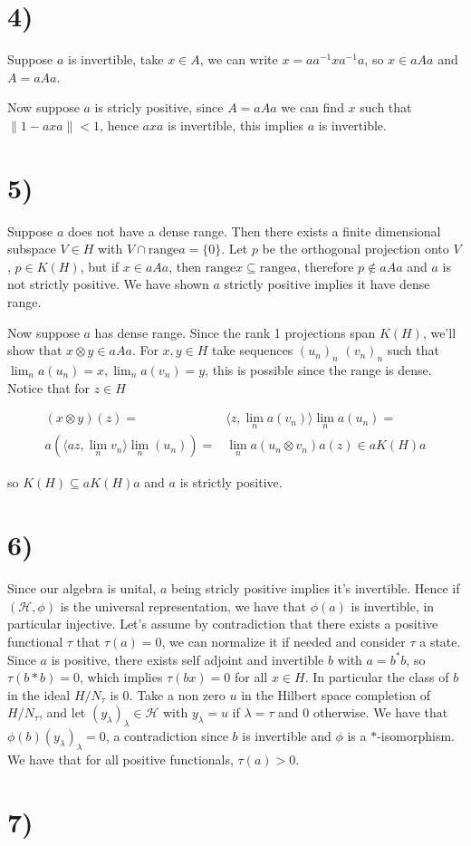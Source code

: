\documentclass{article}
\begin{document}
\section*{4)}

Suppose $a$ is invertible, take $x\in A$, we can write $x=a a^{-1}x a^{-1}a$,
so $x\in aAa$ and $A=aAa$.

Now suppose $a$ is stricly positive, since $A=aAa$ we can find $x$ such that
$\|1-axa\|<1$, hence $axa$ is invertible, this implies $a$ is invertible. 

\section*{5)}

Suppose $a$ does not have a dense range. Then there exists a finite dimensional
subspace $V\in H$ with $V\cap \text{range} a=\{0\}$. Let $p$ be the orthogonal
projection onto $V$, $p\in K(H)$, but if $x\in aAa$, then $\text{range} x\subseteq 
\text{range} a $, therefore $p\notin aAa$ and $a$ is not strictly positive.
We have shown $a$ strictly positive implies it have dense range.

Now suppose $a$ has dense range. Since the rank 1 projections span $K(H)$, 
we'll show that $x\otimes y \in aAa$. For $x,y\in H$ take sequences $(u_n)_n$
$(v_n)_n$ such that $\lim_n a(u_n)=x, \lim_n a(v_n)=y$, this is possible since
the range is dense.
Notice that  for $z\in H$

\begin{align*}
    (x\otimes y)(z)=& \langle z,\lim_n a(v_n) \rangle \lim_n a(u_n)=\\
    a (\langle az, \lim_n v_n \rangle \lim_n (u_n))=&\lim_n a(u_n\otimes v_n)a(z)\in aK(H)a
\end{align*}

so $K(H)\subseteq aK(H)a$ and $a$ is strictly positive.


\section*{6)}

Since our algebra is unital, $a$ being stricly positive implies it's invertible.
Hence if $(\mathcal{H},\phi)$ is the universal representation, we have that $\phi(a)$ is
invertible, in particular injective. 
Let's assume by contradiction that there exists a positive functional
 $\tau$ that $\tau(a)=0$, we can normalize it if needed and consider $\tau$
 a state. 
 Since $a$ is positive, there exists self adjoint and invertible  $b$ with $a=b^* b$,
 so $\tau(b*b)=0$, which implies $\tau(bx)=0$ for all $x\in H$. In particular
 the class of $b$ in the ideal $H/N_\tau$ is $0$. Take a non zero $u$ in 
 the Hilbert space completion of $H/N_\tau$, and let $(y_\lambda)_\lambda \in 
 \mathcal{H}$ with $y_\lambda=u $ if $\lambda=\tau$ and $0$ otherwise.
 We have that $\phi(b)(y_\lambda)_\lambda=0$, a contradiction since $b$
 is invertible and $\phi$ is a $*$-isomorphism. 
 We have that for all positive functionals, $\tau(a)>0$.  


 \section*{7)}

 
\end{document}
